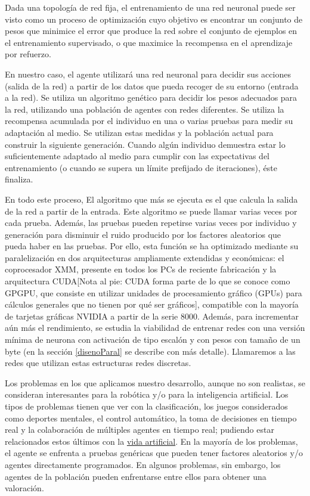 \documentclass[11pt]{article}
\begin{document}
\begin{titlepage}
 Dada una topolog\'ia de red fija, el entrenamiento de una red neuronal puede ser visto como un proceso de optimizaci\'on cuyo objetivo es encontrar un conjunto de pesos que minimice el error que produce la red sobre el conjunto de ejemplos en el entrenamiento supervisado, o que maximice la recompensa en el aprendizaje por refuerzo.

 En nuestro caso, el agente utilizar\'a una red neuronal para decidir sus acciones (salida de la red) a partir de los datos que pueda recoger de su entorno (entrada a la red). Se utiliza un algoritmo gen\'etico para decidir los pesos adecuados para la red, utilizando una poblaci\'on de agentes con redes diferentes. Se utiliza la recompensa acumulada por el individuo en una o varias pruebas para medir su adaptaci\'on al medio. Se utilizan estas medidas y la poblaci\'on actual para construir la siguiente generaci\'on. Cuando alg\'un individuo demuestra estar lo suficientemente adaptado al medio para cumplir con las expectativas del entrenamiento (o cuando se supera un l\'imite prefijado de iteraciones), \'este finaliza.

 En todo este proceso, El algoritmo que m\'as se ejecuta es el que calcula la salida de la red a partir de la entrada. Este algoritmo se puede llamar varias veces por cada prueba. Adem\'as, las pruebas pueden repetirse varias veces por individuo y generaci\'on para disminuir el ruido producido por los factores aleatorios que pueda haber en las pruebas. Por ello, esta funci\'on se ha optimizado mediante su paralelizaci\'on en dos arquitecturas ampliamente extendidas y econ\'omicas: el coprocesador XMM, presente en todos los PCs de reciente fabricaci\'on y la arquitectura CUDA[Nota al pie: CUDA forma parte de lo que se conoce como GPGPU, que consiste en utilizar unidades de procesamiento gr\'afico (GPUs) para c\'alculos generales que no tienen por qu\'e ser gr\'aficos], compatible con la mayor\'ia de tarjetas gr\'aficas NVIDIA a partir de la serie 8000. Adem\'as, para incrementar a\'un m\'as el rendimiento, se estudia la viabilidad de entrenar redes con una versi\'on m\'inima de neurona con activaci\'on de tipo escal\'on y con pesos con tama\~no de un byte (en la secci\'on \ref{disenoParal} se describe con m\'as detalle). Llamaremos a las redes que utilizan estas estructuras redes discretas.

 Los problemas en los que aplicamos nuestro desarrollo, aunque no son realistas, se consideran interesantes para la rob\'otica y/o para la inteligencia artificial. Los tipos de problemas tienen que ver con la clasificaci\'on, los juegos considerados como deportes mentales, el control autom\'atico, la toma de decisiones en tiempo real y la colaboraci\'on de m\'ultiples agentes en tiempo real; pudiendo estar relacionados estos \'ultimos con la
\href{http://es.wikipedia.org/wiki/Vida_artificial}{vida artificial}. En la mayor\'ia de los problemas, el agente se enfrenta a pruebas gen\'ericas que pueden tener factores aleatorios y/o agentes directamente programados. En algunos problemas, sin embargo, los agentes de la poblaci\'on pueden enfrentarse entre ellos para obtener una valoraci\'on.


\end{titlepage}
\end{document}
